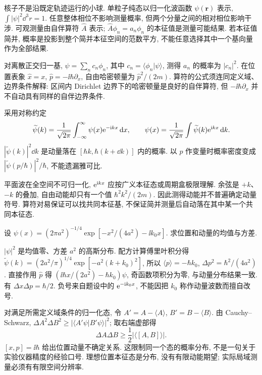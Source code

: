 \label{ch:qm-core}
核子不是沿既定轨迹运行的小球. 单粒子纯态以归一化波函数 $\psi(\mathbf r)$ 表示, $\int|\psi|^2\dd^3r=1$. 任意整体相位不影响测量概率, 但两个分量之间的相对相位影响干涉. 可观测量由自伴算符 $\hat A$ 表示; $\hat A\phi_n=a_n\phi_n$ 的本征值是测量可能结果. 若本征值简并, 概率是投影到整个简并本征空间的范数平方, 不能任意选择其中一个基向量作为全部结果.

对离散正交归一基, $\psi=\sum_nc_n\phi_n$, 其中 $c_n=\langle\phi_n|\psi\rangle$, 测得 $a_n$ 的概率为 $|c_n|^2$. 在位置表象 $\hat x=x$, $\hat p=-\ii\hbar\partial_x$, 自由哈密顿量为 $\hat p^2/(2m)$. 算符的公式须连同定义域、边界条件解释: 区间内 Dirichlet 边界下的哈密顿量是良好的自伴算符, 但 $-\ii\hbar\partial_x$ 并不自动具有同样的自伴边界条件.

采用对称约定
\begin{equation}
 \widetilde\psi(k)=\frac1{\sqrt{2\pi}}\int_{-\infty}^{\infty}\psi(x)\mathrm e^{-\mathrm i kx}\,\mathrm d x,
 \qquad \psi(x)=\frac1{\sqrt{2\pi}}\int\widetilde\psi(k)\mathrm e^{\mathrm i kx}\,\mathrm d k.
\end{equation}
$|\widetilde\psi(k)|^2\dd k$ 是动量落在 $[\hbar k,\hbar(k+\dd k)]$ 内的概率. 以 $p$ 作变量时概率密度变成 $|\widetilde\psi(p/\hbar)|^2/\hbar$, 不能遗漏雅可比.

平面波在全空间不可归一化, $\mathrm e^{\mathrm i kx}$ 应按广义本征态或周期盒极限理解. 余弦是 $+k$、$-k$ 的叠加, 自由动能却只有一个值 $\hbar^2k^2/(2m)$. 因此测得动能并不普遍确定动量符号. 算符对易保证可以找共同本征基, 不保证简并测量后自动落在其中某一个共同本征态.

\begin{example}
设 $\psi(x)=(2\pi a^2)^{-1/4}\exp[-x^2/(4a^2)-\ii k_0x]$. 求位置和动量的均值与方差.
\end{example}
\begin{solution}
$|\psi|^2$ 是均值零、方差 $a^2$ 的高斯分布. 配方计算傅里叶积分得
$\widetilde\psi(k)=(2a^2/\pi)^{1/4}\exp[-a^2(k+k_0)^2]$, 所以 $\langle p\rangle=-\hbar k_0$, $\Delta p^2=\hbar^2/(4a^2)$. 直接作用 $\hat p$ 得 $(\ii\hbar x/(2a^2)-\hbar k_0)\psi$, 奇函数项积分为零, 与动量分布结果一致. 有 $\Delta x\Delta p=\hbar/2$. 负号来自题设中的 $\mathrm e^{-\mathrm i k_0x}$, 不能因把 $k_0$ 称作动量波数而擅自改号.
\end{solution}

对满足所需定义域条件的归一化态, 令 $A'=A-\langle A\rangle$, $B'=B-\langle B\rangle$. 由 Cauchy--Schwarz,
$\Delta A^2\Delta B^2\ge|\langle A'\psi|B'\psi\rangle|^2$; 取右端虚部得
\begin{equation}
 \Delta A\Delta B\ge\frac12|\langle[A,B]\rangle|.
\end{equation}
$[x,p]=\ii\hbar$ 给出位置动量不确定关系. 这限制同一个态的概率分布, 不是一句关于实验仪器精度的经验口号. 理想位置本征态是分布, 没有有限动能期望; 实际局域测量必须有有限空间分辨率.


